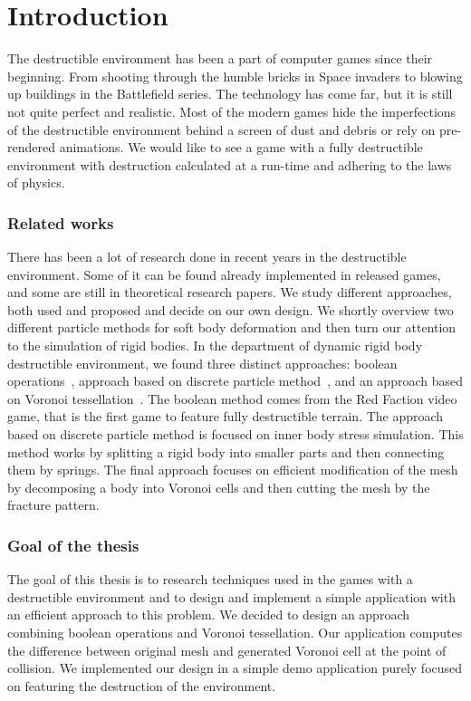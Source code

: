 \chapter*{Introduction}
The destructible environment has been a part of computer games since their beginning. From shooting through the humble bricks in Space invaders to blowing up buildings in the Battlefield series. The technology has come far, but it is still not quite perfect and realistic. Most of the modern games hide the imperfections of the destructible environment behind a screen of dust and debris or rely on pre-rendered animations. We would like to see a game with a fully destructible environment with destruction calculated at a run-time and adhering to the laws of physics.

\subsection*{Related works}
There has been a lot of research done in recent years in the destructible environment. Some of it can be found already implemented in released games, and some are still in theoretical research papers. We study different approaches, both used and proposed and decide on our own design. We shortly overview two different particle methods for soft body deformation and then turn our attention to the simulation of rigid bodies. 
In the department of dynamic rigid body destructible environment, we found three distinct approaches: boolean operations~\cite{geomod}, approach based on discrete particle method~\cite{edem}, and an approach based on Voronoi tessellation~\cite{nvidia}. The boolean method comes from the Red Faction video game, that is the first game to feature fully destructible terrain. The approach based on discrete particle method is focused on inner body stress simulation. This method works by splitting a rigid body into smaller parts and then connecting them by springs. The final approach focuses on efficient modification of the mesh by decomposing a body into Voronoi cells and then cutting the mesh by the fracture pattern.

\subsection*{Goal of the thesis}
The goal of this thesis is to research techniques used in the games with a destructible environment and to design and implement a simple application with an efficient approach to this problem. We decided to design an approach combining boolean operations and Voronoi tessellation. Our application computes the difference between original mesh and generated Voronoi cell at the point of collision. We implemented our design in a simple demo application purely focused on featuring the destruction of the environment.

